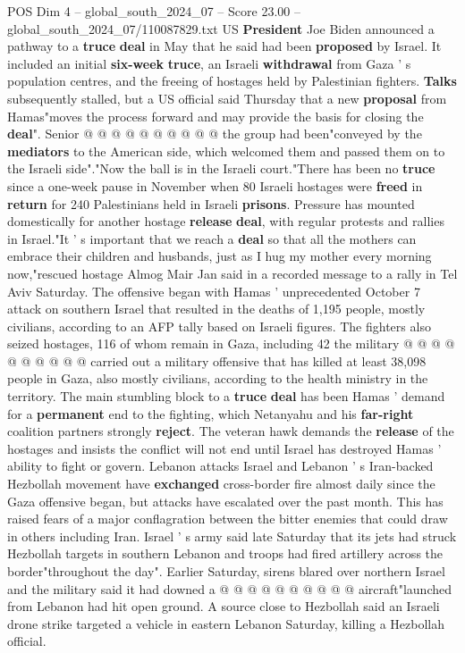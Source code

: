 \begin{textsample}{POS Dim 4 – global\_south\_2024\_07 – Score 23.00 – global\_south\_2024\_07/110087829.txt}
US \textbf{President} Joe Biden announced a pathway to a \textbf{truce} \textbf{deal} in May that he said had been \textbf{proposed} by Israel.
It included an initial \textbf{six-week} \textbf{truce}, an Israeli \textbf{withdrawal} from Gaza ' s population centres, and the freeing of hostages held by Palestinian fighters. \textbf{Talks} subsequently stalled, but a US official said Thursday that a new \textbf{proposal} from Hamas"moves the process forward and may provide the basis for closing the \textbf{deal}".
Senior @ @ @ @ @ @ @ @ @ @ the group had been"conveyed by the \textbf{mediators} to the American side, which welcomed them and passed them on to the Israeli side"."Now the ball is in the Israeli court."There has been no \textbf{truce} since a one-week pause in November when 80 Israeli hostages were \textbf{freed} in \textbf{return} for 240 Palestinians held in Israeli \textbf{prisons}.
Pressure has mounted domestically for another hostage \textbf{release} \textbf{deal}, with regular protests and rallies in Israel."It ' s important that we reach a \textbf{deal} so that all the mothers can embrace their children and husbands, just as I hug my mother every morning now,"rescued hostage Almog Mair Jan said in a recorded message to a rally in Tel Aviv Saturday.
The offensive began with Hamas ' unprecedented October 7 attack on southern Israel that resulted in the deaths of 1,195 people, mostly civilians, according to an AFP tally based on Israeli figures.
The fighters also seized hostages, 116 of whom remain in Gaza, including 42 the military @ @ @ @ @ @ @ @ @ @ carried out a military offensive that has killed at least 38,098 people in Gaza, also mostly civilians, according to the health ministry in the territory.
The main stumbling block to a \textbf{truce} \textbf{deal} has been Hamas ' demand for a \textbf{permanent} end to the fighting, which Netanyahu and his \textbf{far-right} coalition partners strongly \textbf{reject}.
The veteran hawk demands the \textbf{release} of the hostages and insists the conflict will not end until Israel has destroyed Hamas ' ability to fight or govern.
Lebanon attacks Israel and Lebanon ' s Iran-backed Hezbollah movement have \textbf{exchanged} cross-border fire almost daily since the Gaza offensive began, but attacks have escalated over the past month.
This has raised fears of a major conflagration between the bitter enemies that could draw in others including Iran.
Israel ' s army said late Saturday that its jets had struck Hezbollah targets in southern Lebanon and troops had fired artillery across the border"throughout the day".
Earlier Saturday, sirens blared over northern Israel and the military said it had downed a @ @ @ @ @ @ @ @ @ @ aircraft"launched from Lebanon had hit open ground.
A source close to Hezbollah said an Israeli drone strike targeted a vehicle in eastern Lebanon Saturday, killing a Hezbollah official.

\end{textsample}
